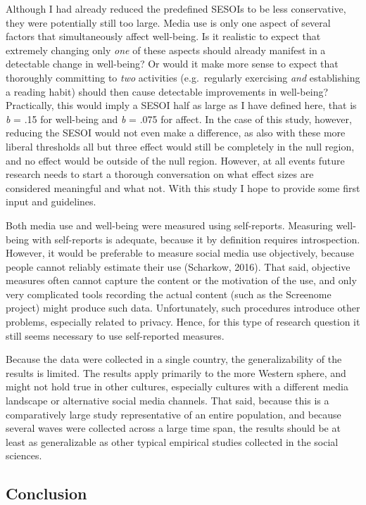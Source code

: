 \documentclass[
  english,
  man,mask,floatsintext]{apa6}
\begin{document}
Although I had already reduced the predefined SESOIs to be less conservative, they were potentially still too large.
Media use is only one aspect of several factors that simultaneously affect well-being.
Is it realistic to expect that extremely changing only \emph{one} of these aspects should already manifest in a detectable change in well-being?
Or would it make more sense to expect that thoroughly committing to \emph{two} activities (e.g.~regularly exercising \emph{and} establishing a reading habit) should then cause detectable improvements in well-being?
Practically, this would imply a SESOI half as large as I have defined here, that is \emph{b} = \textbar.15\textbar{} for well-being and \emph{b} = \textbar.075\textbar{} for affect.
In the case of this study, however, reducing the SESOI would not even make a difference, as also with these more liberal thresholds all but three effect would still be completely in the null region, and no effect would be outside of the null region.
However, at all events future research needs to start a thorough conversation on what effect sizes are considered meaningful and what not.
With this study I hope to provide some first input and guidelines.

Both media use and well-being were measured using self-reports.
Measuring well-being with self-reports is adequate, because it by definition requires introspection.
However, it would be preferable to measure social media use objectively, because people cannot reliably estimate their use (Scharkow, 2016).
That said, objective measures often cannot capture the content or the motivation of the use, and only very complicated tools recording the actual content (such as the Screenome project) might produce such data.
Unfortunately, such procedures introduce other problems, especially related to privacy.
Hence, for this type of research question it still seems necessary to use self-reported measures.

Because the data were collected in a single country, the generalizability of the results is limited.
The results apply primarily to the more Western sphere, and might not hold true in other cultures, especially cultures with a different media landscape or alternative social media channels.
That said, because this is a comparatively large study representative of an entire population, and because several waves were collected across a large time span, the results should be at least as generalizable as other typical empirical studies collected in the social sciences.

\hypertarget{conclusion}{%
\subsection{Conclusion}\label{conclusion}}
\end{document}
